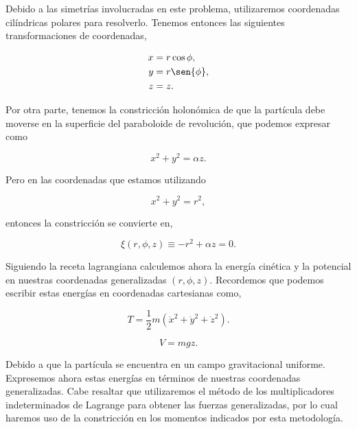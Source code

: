 \documentclass[a4paper,10pt]{article}
\numberwithin{equation}{section}
\begin{document}
Debido a las simetrías involucradas en este problema, utilizaremos coordenadas cilíndricas 
polares para resolverlo. Tenemos entonces las siguientes transformaciones de coordenadas,

\begin{align}
 x &= r\cos{\phi}, \\
 y &= r\sen{\phi}, \\
 z &= z.
 \label{eq:transfCoordenadasParab}
\end{align}

Por otra parte, tenemos la constricción holonómica de que la partícula debe moverse 
en la superficie del paraboloide de revolución, que podemos expresar como

\begin{equation}
 x^2 + y^2 = \alpha z.
\end{equation}

Pero en las coordenadas que estamos utilizando

\begin{equation}
 x^2 + y^2 = r^2,
\end{equation}

entonces la constricción se convierte en,

\begin{equation}
 \xi(r,\phi,z) \equiv - r^2 + \alpha z = 0.
 \label{eq:constriccionParab}
\end{equation}

Siguiendo la receta lagrangiana calculemos ahora la energía cinética y la potencial 
en nuestras coordenadas generalizadas $(r,\phi,z)$. Recordemos que podemos escribir 
estas energías en coordenadas cartesianas como,

\begin{equation}
 T = \frac{1}{2}m(\dot{x}^2 + \dot{y}^2 +\dot{z}^2).
 \label{eq:energCinetParab1}
\end{equation}

\begin{equation}
 V = mgz.
 \label{eq:energPotenParab1}
\end{equation}

Debido a que la partícula se encuentra en un campo gravitacional uniforme. Expresemos 
ahora estas energías en términos de nuestras coordenadas generalizadas. Cabe resaltar 
que utilizaremos el método de los multiplicadores indeterminados de Lagrange para obtener 
las fuerzas generalizadas, por lo cual haremos uso de la constricción en los momentos 
indicados por esta metodología. 

\vspace{.3cm}
\end{document}
